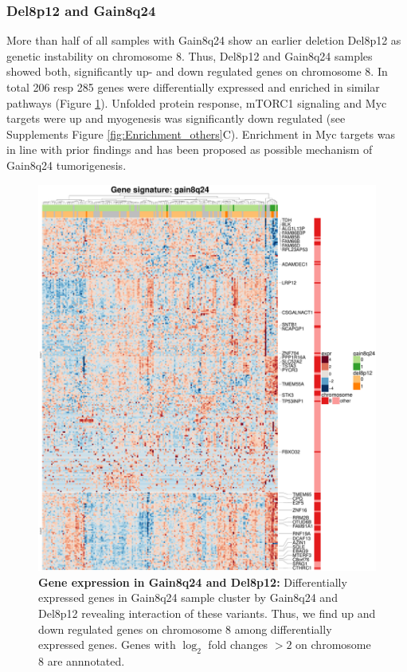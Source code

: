 \subsubsection{Del8p12 and Gain8q24}
More than half of all samples with Gain8q24 show an earlier deletion Del8p12 as genetic instability on chromosome 8. Thus, Del8p12 and Gain8q24 samples showed both, significantly up- and down regulated genes on chromosome 8. In total 206 resp 285 genes were differentially expressed and enriched in similar pathways (Figure \ref{fig:gene_exprgain8q24_gsea_Hallmark}). Unfolded protein response, mTORC1 signaling and Myc targets were up and myogenesis was significantly down regulated (see Supplements Figure \ref{fig:Enrichment_others}C). Enrichment in Myc targets was in line with prior findings and has been proposed as possible mechanism of Gain8q24 tumorigenesis.

\FloatBarrier

\begin{figure}
	\centering
	\includegraphics[width=\columnwidth]{./Figures/gene_exprgain8q24_gsea_Hallmark.pdf}
	\caption{\textbf{Gene expression in Gain8q24 and Del8p12:} Differentially expressed genes in Gain8q24 sample cluster by Gain8q24 and Del8p12 revealing interaction of these variants. Thus, we find up and down regulated genes on chromosome 8  among differentially expressed genes. Genes with $\log_2$ fold changes $>2$ on chromosome 8 are annnotated.}
	\label{fig:gene_exprgain8q24_gsea_Hallmark}
\end{figure}

